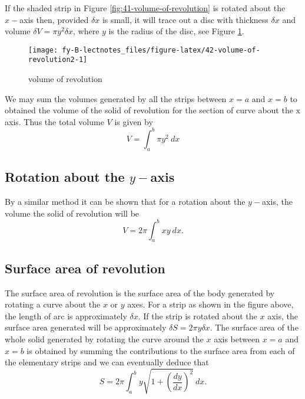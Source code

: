 \documentclass[
  11pt,
  oneside]{book}
\newcommand{\slide}{}
\theoremstyle{definition}
\theoremstyle{definition}
\theoremstyle{definition}
\theoremstyle{definition}
\theoremstyle{remark}
\begin{document}
If the shaded strip in Figure \ref{fig:41-volume-of-revolution} is rotated about the \(x-\)axis then, provided \(\delta x\) is small, it will trace out a disc with thickness \(\delta x\) and volume \(\delta V = \pi y^2\delta x\), where \(y\) is the radius of the disc, see Figure \ref{fig:42-volume-of-revolution2}.
\slide

\begin{figure}

{\centering \texttt{[image: fy-B-lectnotes\_files/figure-latex/42-volume-of-revolution2-1]} 

}

\caption{volume of revolution}\label{fig:42-volume-of-revolution2}
\end{figure}

We may sum the volumes generated by all the strips between \(x = a\) and \(x = b\) to obtained the volume of the solid of revolution for the section of curve about the x axis.
Thus the total volume \(V\) is given by
\[
V = \int_a^b\pi y^2\ dx
\]
\slide

\subsection{\texorpdfstring{Rotation about the \(y-\)axis}{Rotation about the y-axis}}\label{rotation-about-the-y-axis}

By a similar method it can be shown that for a rotation about the \(y-\)axis, the volume the solid of revolution will be
\[
V = 2\pi\int_a^bxy\ dx.
\]
\slide

\subsection{Surface area of revolution}\label{surface-area-of-revolution}

The surface area of revolution is the surface area of the body generated by rotating a curve about the \(x\) or \(y\) axes. For a strip as shown in the figure above, the length of arc is approximately \(\delta x\). If the strip is rotated about the \(x\) axis, the surface area generated will be approximately \(\delta S = 2\pi y\delta x\). The surface area of the whole solid generated by rotating the curve around the \(x\) axis between \(x = a\) and \(x = b\) is obtained by summing the contributions to the surface area from each of the elementary strips and we can eventually deduce that
\[
S = 2\pi\int_a^b y\sqrt{1+\left(\frac{dy}{dx}\right)^2}\ dx.
\]
\slide
\end{document}
